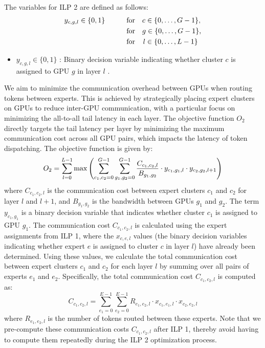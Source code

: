 The variables for ILP 2 are defined as follows:
\vspace{-0.5em}
\begin{align*}
    y_{c,g,l} \in \{0, 1\} \quad \quad \quad &\text{for} \quad c \in \{0, \dots, G-1\}, \\
    &\text{for} \quad g \in \{0, \dots, G-1\}, \\
    &\text{for} \quad \hspace{0.12em} l \in \{0, \dots, L-1\}
\end{align*}
\begin{itemize}
\vspace{-0.5em}
\item \( y_{c,g,l} \in \{0, 1\} \) : Binary decision variable indicating whether cluster \( c \) is assigned to GPU \( g \) in layer \( l \) .
\end{itemize}


%
We aim to minimize the communication overhead between GPUs when routing tokens between experts. 
%
This is achieved by strategically placing expert clusters on GPUs to reduce inter-GPU communication, with a particular focus on minimizing the all-to-all tail latency in each layer.
%
The objective function \( O_2 \) directly targets the tail latency per layer by minimizing the maximum communication cost across all GPU pairs, which impacts the latency of token dispatching. The objective function is given by:
%
\vspace{-1ex}
\begin{equation}
    \small
    O_2 = \sum_{l=0}^{L-1} \max \left( \sum_{c_1, c_2 = 0}^{G-1} \sum_{g_1, g_2 = 0}^{G-1} \frac{C_{c_1, c_2, l}}{B_{g_1, g_2}} \cdot y_{c_1, g_1, l} \cdot y_{c_2, g_2, l+1} \right)
\end{equation}
where $C_{c_1, c_2, l}$ is the communication cost between expert clusters  $c_1$ and $c_2$ for layer $l$ and $l+1$, and $B_{g_1, g_2}$ is the bandwidth between GPUs $g_1$ and $g_2$.
%
The term $y_{c_1, g_1}$ is a binary decision variable that indicates whether cluster $c_1$ is assigned to GPU $g_1$.
%
The communication cost $C_{c_1, c_2, l}$ is calculated using the expert assignments from ILP 1, where the $x_{c,e,l}$ values (the binary decision variables indicating whether expert $e$  is assigned to cluster $c$ in layer $l$) have already been determined. 
%
Using these values, we calculate the total communication cost between expert clusters $c_1$ and $c_2$ for each layer $l$ by summing over all pairs of experts $e_1$ and $e_2$. Specifically, the total communication cost $C_{c_1, c_2, l}$ is computed as:
%
\vspace{-1ex}
\begin{equation}
    C_{c_1, c_2, l} = \sum_{e_1=0}^{E-1} \sum_{e_2=0}^{E-1} R_{e_1, e_2, l} \cdot x_{c_1,e_1,l} \cdot x_{c_2,e_2,l}
\end{equation}
%
where $R_{e_1, e_2, l}$ is the number of tokens routed between these experts.
%
Note that we pre-compute these communication costs \( C_{c_1, c_2, l} \) after ILP 1, thereby avoid having to compute them repeatedly during the ILP 2 optimization process. 
%

